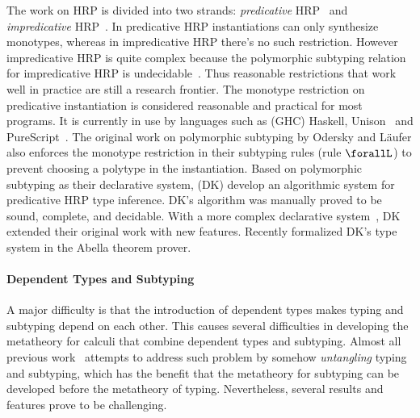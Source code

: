 The work on HRP is divided into two strands: \emph{predicative} HRP~\citep{dunfield2013complete,jones2007practical,odersky1996putting,dunfield2019sound}
and \emph{impredicative} HRP~\citep{le2003ml,leijen2008hmf,vytiniotis2008fph,Serrano2018}.
In predicative HRP instantiations can
only synthesize monotypes, whereas in impredicative HRP there's no
such restriction. However impredicative HRP is quite complex because
the polymorphic subtyping relation for impredicative HRP is undecidable~\citep{tiuryn1996subtyping}.
Thus reasonable restrictions that work well in practice are still
a research frontier.
The monotype restriction on predicative instantiation is considered reasonable
and practical for most programs. It is currently in use by languages such as
(GHC) Haskell, Unison~\citep{Unison} and PureScript~\citep{PureScript}.
The original work on polymorphic subtyping by Odersky and L\"aufer also enforces
the monotype restriction in their subtyping rules (rule $\forallL$) to prevent
choosing a polytype in the instantiation. Based on polymorphic subtyping as
their declarative system,
\cite{dunfield2013complete} (DK) develop an
algorithmic system for predicative HRP type inference. DK's algorithm was
manually proved to be sound, complete, and decidable.
With a more complex declarative system~\citep{dunfield2019sound}, DK
extended their original work with new features.
Recently \cite{zhao19mechanical} formalized DK's type system in the Abella
theorem prover.

\paragraph{Dependent Types and Subtyping}
A major difficulty is that the introduction of dependent
types makes typing and subtyping depend on each other. This causes
several difficulties in developing the metatheory for calculi that
combine dependent types and subtyping. Almost all previous
work~\citep{subdep,ptssub,chen1,cocsub,Chen03coc} attempts to address such problem by somehow
\emph{untangling} typing and subtyping, which has the benefit that the
metatheory for subtyping can be developed before the metatheory of
typing. Nevertheless, several results and features prove to be
challenging.

